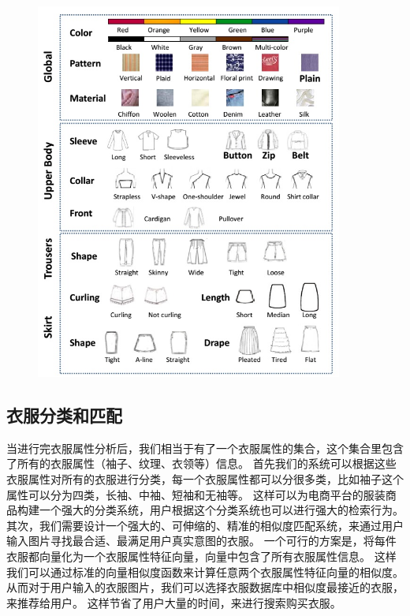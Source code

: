 \begin{figure}
\centering
\includegraphics[width=0.9\textwidth]{img/attribute.jpg}
\label{fig:attribute}
\end{figure}

\subsection{衣服分类和匹配}
当进行完衣服属性分析后，我们相当于有了一个衣服属性的集合，这个集合里包含了所有的衣服属性（袖子、纹理、衣领等）信息。
首先我们的系统可以根据这些衣服属性对所有的衣服进行分类，每一个衣服属性都可以分很多类，比如袖子这个属性可以分为四类，长袖、中袖、短袖和无袖等。
这样可以为电商平台的服装商品构建一个强大的分类系统，用户根据这个分类系统也可以进行强大的检索行为。
其次，我们需要设计一个强大的、可伸缩的、精准的相似度匹配系统，来通过用户输入图片寻找最合适、最满足用户真实意图的衣服。
一个可行的方案是，将每件衣服都向量化为一个衣服属性特征向量，向量中包含了所有衣服属性信息。
这样我们可以通过标准的向量相似度函数来计算任意两个衣服属性特征向量的相似度。
从而对于用户输入的衣服图片，我们可以选择衣服数据库中相似度最接近的衣服，来推荐给用户。
这样节省了用户大量的时间，来进行搜索购买衣服。

